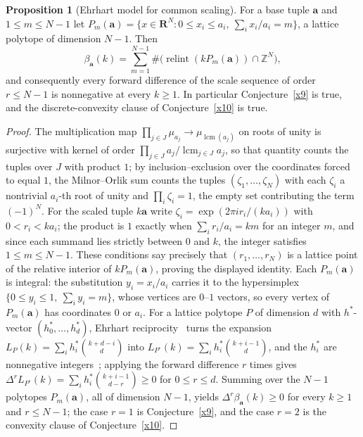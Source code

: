 \documentclass[11pt]{article}
\theoremstyle{definition}
\newcommand{\Z}{\mathbb Z}
\providecommand{\Z}{\mathbb Z}
\newtheorem{proposition}{Proposition}
\begin{document}
\begin{proposition}[Ehrhart model for common scaling]\label{x:ehrhart}
For a base tuple $\mathbf a$ and $1\le m\le N-1$ let $P_m(\mathbf a)=\{x\in\mathbf R^N:0\le x_i\le a_i,\ \sum_ix_i/a_i=m\}$, a lattice polytope of dimension $N-1$.  Then
\[
\beta_{\mathbf a}(k)=\sum_{m=1}^{N-1}\#\bigl(\operatorname{relint}(kP_m(\mathbf a))\cap\Z^N\bigr),
\]
and consequently every forward difference of the scale sequence of order $r\le N-1$ is nonnegative at every $k\ge1$.  In particular Conjecture~\ref{x9} is true, and the discrete-convexity clause of Conjecture~\ref{x10} is true.
\end{proposition}

\begin{proof}
The multiplication map $\prod_{j\in J}\mu_{a_j}\to\mu_{\operatorname{lcm}(a_j)}$ on roots of unity is surjective with kernel of order $\prod_{j\in J}a_j/\operatorname{lcm}_{j\in J}a_j$, so that quantity counts the tuples over $J$ with product $1$; by inclusion--exclusion over the coordinates forced to equal $1$, the Milnor--Orlik sum counts the tuples $(\zeta_1,\ldots,\zeta_N)$ with each $\zeta_i$ a nontrivial $a_i$-th root of unity and $\prod_i\zeta_i=1$, the empty set contributing the term $(-1)^N$.  For the scaled tuple $k\mathbf a$ write $\zeta_i=\exp(2\pi ir_i/(ka_i))$ with $0<r_i<ka_i$; the product is $1$ exactly when $\sum_ir_i/a_i=km$ for an integer $m$, and since each summand lies strictly between $0$ and $k$, the integer satisfies $1\le m\le N-1$.  These conditions say precisely that $(r_1,\ldots,r_N)$ is a lattice point of the relative interior of $kP_m(\mathbf a)$, proving the displayed identity.  Each $P_m(\mathbf a)$ is integral: the substitution $y_i=x_i/a_i$ carries it to the hypersimplex $\{0\le y_i\le1,\ \sum_iy_i=m\}$, whose vertices are $0$--$1$ vectors, so every vertex of $P_m(\mathbf a)$ has coordinates $0$ or $a_i$.  For a lattice polytope $P$ of dimension $d$ with $h^{*}$-vector $(h^{*}_0,\ldots,h^{*}_d)$, Ehrhart reciprocity~\cite{Mac71} turns the expansion $L_P(k)=\sum_ih^{*}_i\binom{k+d-i}{d}$ into $L_{P^\circ}(k)=\sum_ih^{*}_i\binom{k+i-1}{d}$, and the $h^{*}_i$ are nonnegative integers~\cite{Sta80}; applying the forward difference $r$ times gives $\Delta^rL_{P^\circ}(k)=\sum_ih^{*}_i\binom{k+i-1}{d-r}\ge0$ for $0\le r\le d$.  Summing over the $N-1$ polytopes $P_m(\mathbf a)$, all of dimension $N-1$, yields $\Delta^r\beta_{\mathbf a}(k)\ge0$ for every $k\ge1$ and $r\le N-1$; the case $r=1$ is Conjecture~\ref{x9}, and the case $r=2$ is the convexity clause of Conjecture~\ref{x10}.
\end{proof}
\end{document}

